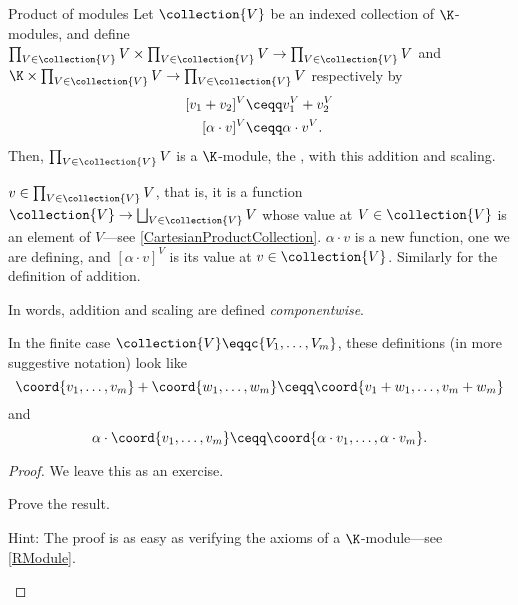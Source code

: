 \begin{prp}{Product of modules}{}
	Let $\collection{V}$ be an indexed collection of $\K$-modules, and define $\prod _{V\in \collection{V}}V\times \prod _{V\in \collection{V}}V\rightarrow \prod _{V\in \collection{V}}V$ and $\K \times \prod _{V\in \collection{V}}V\rightarrow \prod _{V\in \collection{V}}V$ respectively by
	\begin{subequations}
		\begin{align}
			[v_1+v_2]^V & \ceqq v_1^V+v_2^V \\
			[\alpha \cdot v]^V & \ceqq \alpha \cdot v^V.
		\end{align}
	\end{subequations}
	Then, $\prod _{V\in \collection{V}}V$ is a $\K$-module, the , with this addition and scaling.
	\begin{rmk}
		$v\in \prod _{V\in \collection{V}}V$, that is, it is a function $\collection{V}\rightarrow \bigsqcup _{V\in \collection{V}}V$ whose value at $V\in \collection{V}$ is an element of $V$---see \cref{CartesianProductCollection}.  $\alpha \cdot v$ is a new function, one we are defining, and $[\alpha \cdot v]^V$ is its value at $v\in \collection{V}$.  Similarly for the definition of addition.
	\end{rmk}
	\begin{rmk}
		In words, addition and scaling are defined \emph{componentwise}.
	\end{rmk}
	\begin{rmk}
		In the finite case $\collection{V}\eqqc \{ V_1,\ldots ,V_m\}$, these definitions (in more suggestive notation) look like
		\begin{equation}
			\coord{v_1,\ldots ,v_m}+\coord{w_1,\ldots ,w_m}\ceqq \coord{v_1+w_1,\ldots ,v_m+w_m}
		\end{equation}
		and
		\begin{equation}
			\alpha \cdot \coord{v_1,\ldots ,v_m}\ceqq \coord{\alpha \cdot v_1,\ldots ,\alpha \cdot v_m}.
		\end{equation}
	\end{rmk}
	\begin{proof}
		We leave this as an exercise.
		\begin{exr}[breakable=false]{}{}
			Prove the result.
			\begin{rmk}
				Hint:  The proof is as easy as verifying the axioms of a $\K$-module---see \cref{RModule}.
			\end{rmk}
		\end{exr}
	\end{proof} 
\end{prp}

